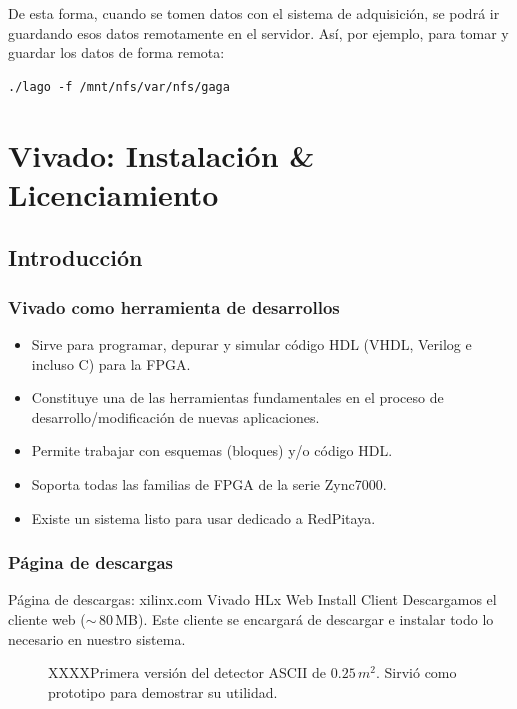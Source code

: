 \documentclass[a4paper,11pt]{article}
\begin{document}
De esta forma, cuando se tomen datos con el sistema de adquisición, se podrá ir
guardando esos datos remotamente en el servidor.
Así, por ejemplo, para tomar y guardar los datos de forma remota:
\begin{verbatim}
./lago -f /mnt/nfs/var/nfs/gaga
\end{verbatim}

\section{Vivado: Instalación \& Licenciamiento}
\subsection{Introducción}

\subsubsection{Vivado como herramienta de desarrollos}
    \begin{itemize}
      \item Sirve para programar, depurar y simular código HDL (VHDL, Verilog e
incluso C) para la FPGA.
      \item Constituye una de las herramientas fundamentales en el proceso de
            desarrollo/modificación de nuevas aplicaciones.
      \item Permite trabajar con esquemas (bloques) y/o código HDL.
      \item Soporta todas las familias de FPGA de la serie Zync7000.
      \item Existe un sistema listo para usar dedicado a RedPitaya.
    \end{itemize}

\subsubsection{Página de descargas}
 Página de descargas: xilinx.com
  Vivado HLx Web Install Client
    Descargamos el cliente web ($\sim$\,80\,MB). Este cliente se encargará de
descargar e instalar todo lo necesario en nuestro sistema.
\begin{figure}[!h]
	\centering				
	\caption{XXXXPrimera versión del detector ASCII de $0.25\,m^2$.
	Sirvió como prototipo para demostrar su utilidad.}
	\label{fig:ASCII1} 
\end{figure}
\end{document}

